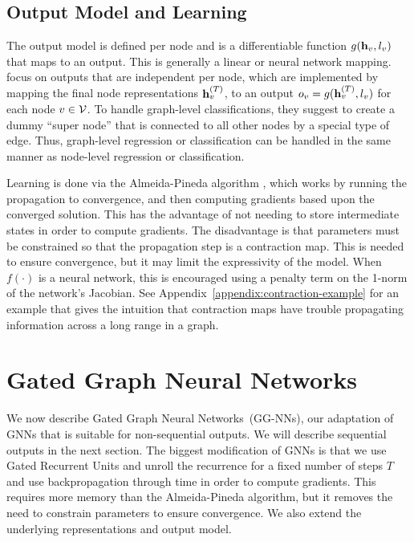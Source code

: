 \documentclass{article} %
\newcommand{\OurMethodMinor}{Gated Graph Neural Network}
\newcommand{\OurMethodMinors}{\OurMethodMinor s}
\newcommand{\OurMethodMinorShort}{GG-NN}
\newcommand{\OurMethodMinorShorts}{\OurMethodMinorShort s}
\begin{document}
\subsection{Output Model and Learning}
The output model is defined per node and is a differentiable function 
$g(\mathbf{h}_{v}, l_{v})$ that maps to an output. This is
generally a linear or neural network mapping.
\cite{scarselli2009graph} focus on
outputs that are independent per node, which are implemented by
mapping the final node representations $\mathbf{h}_{v}^{(T)}$, to an
output $o_{v} = g(\mathbf{h}_{v}^{(T)}, l_{v})$ for each node $v
\in \mathcal{V}$. To handle graph-level classifications, they suggest to
create a dummy ``super node'' that is connected to all other nodes by
a special type of edge. Thus, graph-level regression or classification
can be handled in the same manner as node-level regression or
classification.

Learning is done via the Almeida-Pineda algorithm
\citep{almeida1990learning,pineda1987generalization}, which works by
running the propagation to convergence, and then computing gradients
based upon the converged solution. This has the
advantage of not needing to store intermediate states in order to
compute gradients. The disadvantage is that 
parameters must be constrained so that
the propagation step is a contraction map. This is needed to ensure
convergence, but it may limit the expressivity of the model.
When $f(\cdot)$ is a neural
network, this is encouraged using a penalty term on the 1-norm
of the network's Jacobian.
  See Appendix~\ref{appendix:contraction-example} for an
example that gives the intuition that contraction maps have trouble
propagating information across a long range in a graph.



\section{\OurMethodMinors}

We now describe \OurMethodMinors~(\OurMethodMinorShorts), our
adaptation of GNNs that is suitable for non-sequential outputs. We
will describe sequential outputs in the next section. The biggest
modification of GNNs is that we use Gated Recurrent Units
\citep{cho2014learning} and unroll the recurrence for a fixed number of steps $T$ and use
backpropagation through time in order to compute gradients. This
requires more memory than the Almeida-Pineda algorithm, but it removes
the need to constrain parameters to ensure convergence. We also
extend the underlying representations and output model.
\end{document}
